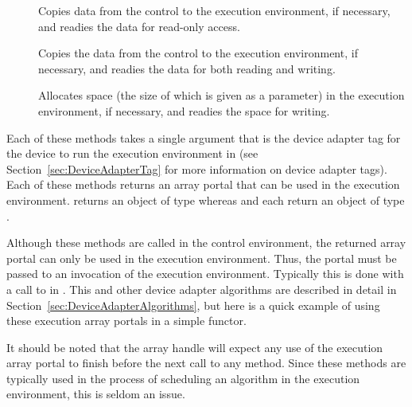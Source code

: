 \begin{description}
\item[]  Copies data from
  the control to the execution environment, if necessary, and readies the
  data for read-only access.
\item[]  Copies the
  data from the control to the execution environment, if necessary, and
  readies the data for both reading and writing.
\item[]  Allocates space
  (the size of which is given as a parameter) in the execution environment,
  if necessary, and readies the space for writing.
\end{description}

Each of these methods takes a single argument that is the device adapter
tag for the device to run the execution environment in (see
Section~\ref{sec:DeviceAdapterTag} for more information on device adapter
tags).  Each of these methods returns an array portal that can be used in
the execution environment.  returns an object of
type
whereas  and  each
return an object of type
.

Although these  methods are called in the control
environment, the returned array portal can only be used in the execution
environment. Thus, the portal must be passed to an invocation of the
execution environment. Typically this is done with a call to
 in . This and other
device adapter algorithms are described in detail in
Section~\ref{sec:DeviceAdapterAlgorithms}, but here is a quick example of
using these execution array portals in a simple functor.


It should be noted that the array handle will expect any use of the
execution array portal to finish before the next call to any
 method. Since these  methods
are typically used in the process of scheduling an algorithm in the
execution environment, this is seldom an issue.

